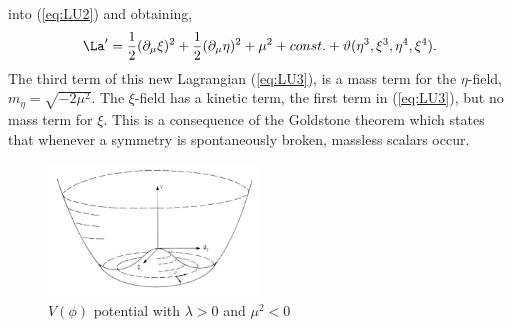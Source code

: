 into (\ref{eq:LU2}) and obtaining,
\begin{equation}
\La'=\frac{1}{2}(\partial_{\mu}\xi)^{2}+\frac{1}{2}(\partial_{\mu}\eta)^2+\mu^{2}+const.+\vartheta(\eta^{3},\xi^{3},\eta^{4},\xi^{4}).
\label{eq:LU3}
\end{equation}
The third term of this new Lagrangian (\ref{eq:LU3}), is a mass term
for the $\eta$-field, $m_{\eta}=\sqrt{-2\mu^{2}}$. The $\xi$-field has
a kinetic term, the first term in (\ref{eq:LU3}), but no mass term
for $\xi$. This is a consequence of the Goldstone theorem which states
that whenever a symmetry is spontaneously broken, massless scalars occur.
\begin{figure}[hb]
  \centering
	\includegraphics[width=0.5\textwidth]{images/mexicanHat.jpg}
  	\caption[Potential]
   	{$V(\phi)$ potential with $\lambda>0$ and $\mu^{2}<0$}
	\label{fig:mexicanHat}
\end{figure}

